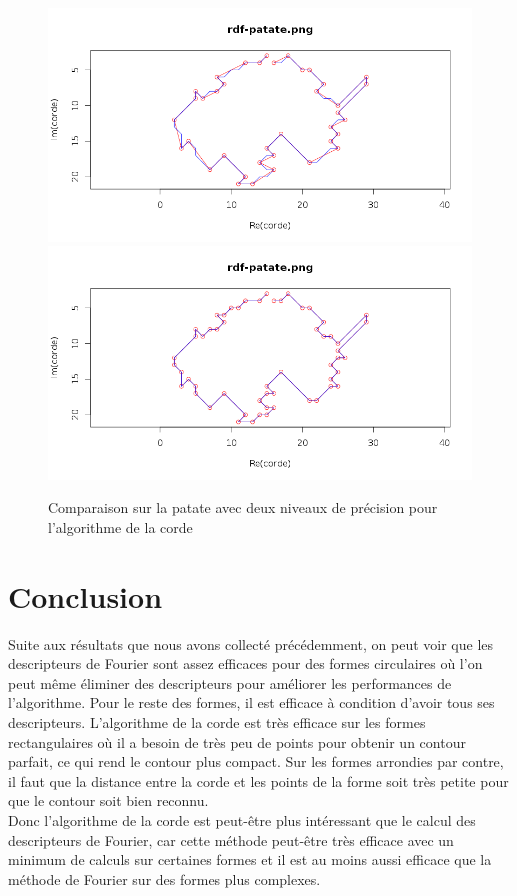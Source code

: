 \documentclass[11pt]{article}
\begin{document}
  
    \begin{figure}[!h]
    \begin{center}
      \includegraphics[width=12cm]{../resultat/comp_patate_impreci.png}
      \includegraphics[width=12cm]{../resultat/comp_patate_preci.png}
      \caption{Comparaison sur la patate avec deux niveaux de précision pour l'algorithme de la corde}
    \end{center}
    \end{figure}
  
  
  \newpage
    
  \section{Conclusion}
  Suite aux résultats que nous avons collecté précédemment, on peut voir que les descripteurs de Fourier sont assez 
  efficaces pour des formes circulaires où l'on peut même éliminer des descripteurs pour améliorer les performances 
  de l'algorithme. Pour le reste des formes, il est efficace à condition d'avoir tous ses descripteurs. L'algorithme 
  de la corde est très efficace sur les formes rectangulaires où il a besoin de très peu de points pour obtenir un 
  contour parfait, ce qui rend le contour plus compact. Sur les formes arrondies par contre, il faut que la distance 
  entre la corde et les points de la forme soit très petite pour que le contour soit bien reconnu.\\
  
  Donc l'algorithme de la corde est peut-être plus intéressant que le calcul des descripteurs de Fourier, car cette méthode 
  peut-être très efficace avec un minimum de calculs sur certaines formes et il est au moins aussi efficace que la méthode 
  de Fourier sur des formes plus complexes.
  
\end{document}
